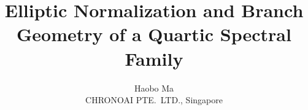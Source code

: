 \documentclass[11pt,letterpaper]{article}
\title{Elliptic Normalization and Branch Geometry of a Quartic Spectral Family}
\author{Haobo Ma\\[4pt]
\small CHRONOAI PTE.\ LTD., Singapore}
\date{}
\theoremstyle{plain}
\theoremstyle{definition}
\theoremstyle{remark}
\begin{document}
\sloppy
\maketitle














\FloatBarrier
\appendix





\FloatBarrier

\end{document}
